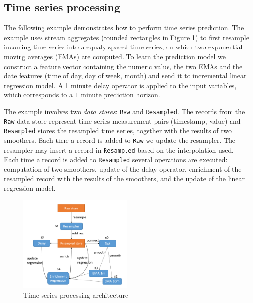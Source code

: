 \documentclass{article} %
\begin{document}
\subsection{Time series processing}

The following example demonstrates how to perform time series prediction. The example uses stream aggregates (rounded rectangles in Figure \ref{fig:timeSeries}) to first resample incoming time series into a equaly spaced time series, on which two exponential moving averages (EMAs) are computed. To learn the prediction model we construct a feature vector containing the numeric value, the two EMAs and the date features (time of day, day of week, month) and send it to incremental linear regression model. A 1 minute delay operator is applied to the input
 variables, which corresponds to a 1 minute prediction horizon.

The example involves two \emph{data stores}: \texttt{Raw} and \texttt{Resampled}. The records from the \texttt{Raw} data store represent time series measurement pairs (timestamp, value) and \texttt{Resampled} stores the resampled time series, together with the results of two smoothers. Each time a record is added to \texttt{Raw} we update the resampler. The resampler may insert a record in
\texttt{Resampled} based on the interpolation used. Each time a record is added to \texttt{Resampled} several operations are executed: computation of two smoothers, update of the delay operator, enrichment of the resampled record with the results of the smoothers, and the update of the linear regression model.

      \begin{figure}[h]
      \begin{center}
      \includegraphics[width=0.5\textwidth]{timeSeries2.PNG}
      \end{center}
      \caption{Time series processing architecture}\label{fig:timeSeries}
      \end{figure}
\end{document}
